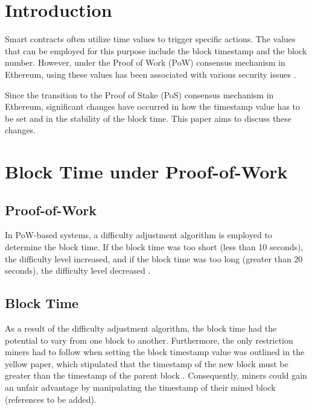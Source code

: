 \section{Introduction}

Smart contracts often utilize time values to trigger specific actions. The
values that can be employed for this purpose include the block timestamp and
the block number. However, under the Proof of Work (PoW) consensus mechanism in
Ethereum, using these values has been associated with various security issues
\cite{swc116} \cite{Conkas2021} \cite{DASP2018} \cite{Osiris2018}
\cite{Oyente2016}.


Since the transition to the Proof of Stake (PoS) consensus mechanism in
Ethereum, significant changes have occurred in how the timestamp value has to
be set and in the stability of the block time. This paper aims to discuss these
changes.


\section{Block Time under Proof-of-Work}

\subsection{Proof-of-Work}

In PoW-based systems, a difficulty adjustment algorithm is employed to
determine the block time. If the block time was too short (less than 10
seconds), the difficulty level increased, and if the block time was too long
(greater than 20 seconds), the difficulty level decreased \cite{eip-2}.

\subsection{Block Time}

As a result of the difficulty adjustment algorithm, the block time had the
potential to vary from one block to another. Furthermore, the only restriction
miners had to follow when setting the block timestamp value was outlined in the
yellow paper, which stipulated that the timestamp of the new block must be
greater than the timestamp of the parent block \cite{ethyellowpaper2023}.
Consequently, miners could gain an unfair advantage by manipulating the
timestamp of their mined block (references to be added).

